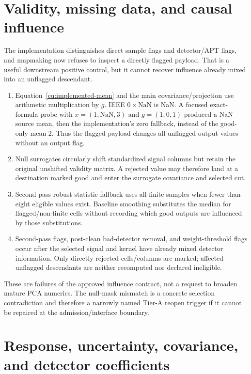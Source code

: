 \documentclass[11pt]{article}
\begin{document}
\section{Validity, missing data, and causal influence}

The implementation distinguishes direct sample flags and detector/APT flags,
and mapmaking now refuses to inspect a directly flagged payload.  That is a
useful downstream positive control, but it cannot recover influence already
mixed into an unflagged descendant.

\begin{enumerate}[leftmargin=*]
\item Equation~\eqref{eq:implemented-mean} and the main covariance/projection
use arithmetic multiplication by \(g\).  IEEE \(0\times\mathrm{NaN}\) is NaN.
A focused exact-formula probe with \(x=(1,\mathrm{NaN},3)\) and
\(g=(1,0,1)\) produced a NaN source mean, then the implementation's zero
fallback, instead of the good-only mean 2.  Thus the flagged payload changes
all unflagged output values without an output flag.
\item Null surrogates circularly shift standardized signal columns but retain
the original unshifted validity matrix.  A rejected value may therefore land
at a destination marked good and enter the surrogate covariance and selected
cut.
\item Second-pass robust-statistic fallback uses all finite samples when fewer
than eight eligible values exist.  Baseline smoothing substitutes the median
for flagged/non-finite cells without recording which good outputs are
influenced by those substitutions.
\item Second-pass flags, post-clean bad-detector removal, and weight-threshold
flags occur after the selected signal and kernel have already mixed detector
information.  Only directly rejected cells/columns are marked; affected
unflagged descendants are neither recomputed nor declared ineligible.
\end{enumerate}

These are failures of the approved influence contract, not a request to
broaden mature PCA numerics.  The null-mask mismatch is a concrete selection
contradiction and therefore a narrowly named Tier-A reopen trigger if it
cannot be repaired at the admission/interface boundary.

\section{Response, uncertainty, covariance, and detector coefficients}
\end{document}
